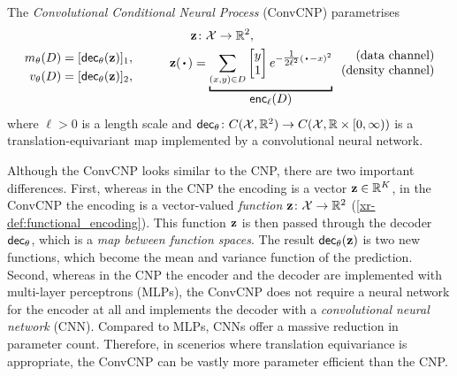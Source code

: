 \documentclass[12pt]{report}
\newcommand{\xrprefix}[1]{xr-#1}
\begin{document}
\begin{model}
    \label{mod:convcnp}
    The \emph{Convolutional Conditional Neural Process} (ConvCNP) parametrises
    \begin{equation*}
        \begin{aligned}
            m_\theta(D) &= [\dec_\theta(\vz)]_1, \\
            v_\theta(D) &= [\dec_\theta(\vz)]_2,
        \end{aligned}
        \quad\qquad
        \begin{aligned}
            \vz \!\!&\,\,\colon \X \to \R^2, \\
            \vz(\vardot) &= \underbracket[1pt]{
                \sum_{(x, y) \in D}
                \begin{bmatrix}
                    y \\ 1
                \end{bmatrix}
                e^{-\tfrac1{2\ell^2}(\vardot - x)^2}
            }_{
                \displaystyle\enc_\ell(D)
            }
            \;\;
            \begin{matrix*}[r]
                \text{\normalshape (data channel)} \\
                \text{\normalshape (density channel)}
            \end{matrix*}
        \end{aligned}
    \end{equation*}
    where $\ell > 0$ is a length scale and $\mathsf{dec}_\theta \colon C(\mathcal{X}, \mathbb{R}^2) \to C(\mathcal{X}, \mathbb{R} \times [0, \infty))$ is a translation-equivariant map implemented by a convolutional neural network.
\end{model}

Although the ConvCNP looks similar to the CNP, there are two important differences.
First, whereas in the CNP the encoding is a vector $\mathbf{z} \in \mathbb{R}^{K}$, in the ConvCNP the encoding is a vector-valued \emph{function} $\mathbf{z}\colon \mathcal{X} \to \mathbb{R}^2$ (\cref{\xrprefix{def:functional_encoding}}).
This function $\mathbf{z}$ is then passed through the decoder $\mathsf{dec}_\theta$, which is a \emph{map between function spaces}.
The result $\mathsf{dec}_\theta(\mathbf{z})$ is two new functions, which become the mean and variance function of the prediction.
Second, whereas in the CNP the encoder and the decoder are implemented with multi-layer perceptrons (MLPs), the ConvCNP does not require a neural network for the encoder at all and implements the decoder with a \emph{convolutional neural network} (CNN).
Compared to MLPs, CNNs offer a massive reduction in parameter count.
Therefore, in scenerios where translation equivariance is appropriate, the ConvCNP can be vastly more parameter efficient than the CNP.
\end{document}

